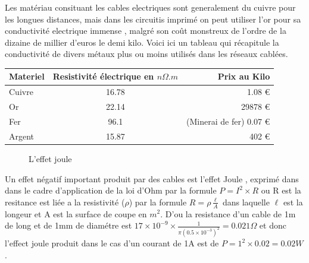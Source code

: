 \documentclass[12pt]{report}
\begin{document}
	Les matériau consituant les cables electriques sont generalement du cuivre pour les longues distances, mais dans les circuitis imprimé on peut utiliser l'or pour sa conductivité electrique immense , malgré son coût monstreux de l'ordre de la dizaine de millier d'euros le demi kilo. Voici ici un tableau qui récapitule la conductivité de divers métaux plus ou moins utilisés dans les réseaux cablées.

\begin{center}
\begin{tabular}{| l | c | r |}
	\hline
	Materiel & Resistivité électrique en \( n\Omega .m \)& Prix au Kilo \\
	\hline
	Cuivre & 16.78 & 1.08 \euro{}  \\
	Or & 22.14 & 29878 \euro{}  \\
	Fer & 96.1 & (Minerai de fer) 0.07 \euro{}  \\
	Argent & 15.87 & 402 \euro{}  \\
	\hline
\end{tabular}
\end{center}

\begin{figure}
  \begin{center}
    \setlength\fboxsep{0pt}
    \setlength\fboxrule{0.5pt}
  \end{center}
  \caption{L'effet joule}
\end{figure}Un effet négatif important produit par des cables est l'effet Joule , exprimé dans dans le cadre d'application de la loi d'Ohm par la formule \( P=I^{2} \times R\)\cite{wiki2} ou R est la resitance est liée a la resistivité (\(\rho\)) par la formule \( R= \rho \frac{\ell}{A} \)\cite{wiki3} dans laquelle \(\ell\) est la longeur et A est la surface de coupe en \(m^2\).
D'ou la resistance d'un cable de 1m de long et de 1mm de diamétre est \(17 \times 10^{-9} \times \frac{1}{\pi (0.5 \times 10^{-3})^{2}} = 0.021 \Omega \) et donc l'effect joule produit dans le cas d'un courant de 1A est de \( P=1^{2} \times 0.02 = 0.02 W\).
\end{document}
